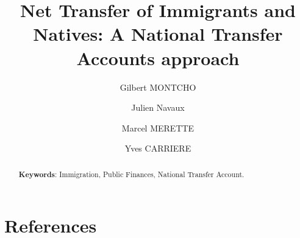 



\title{Net Transfer of Immigrants and Natives: A National Transfer Accounts approach}
\author[1]{Gilbert MONTCHO}
\author[3]{Julien Navaux}
\author[2]{Marcel MERETTE}
\author[1]{Yves CARRIERE}


\maketitle
\begin{abstract}
  

  \vspace{0.7em}\par
  \textbf{Keywords}: Immigration, Public Finances, National Transfer Account.
\end{abstract}

\newpage
\tableofcontents

\newpage


\section*{References}
  \printbibliography[heading=none]
